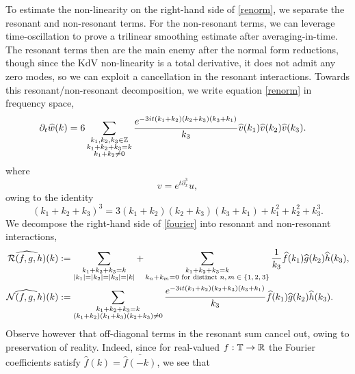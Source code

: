 To estimate the non-linearity on the right-hand side of \eqref{renorm}, we separate the resonant and non-resonant terms. For the non-resonant terms, we can leverage time-oscillation to prove a trilinear smoothing estimate after averaging-in-time. The resonant terms then are the main enemy after the normal form reductions, though since the KdV non-linearity is a total derivative, it does not admit any zero modes, so we can exploit a cancellation in the resonant interactions.  Towards this resonant/non-resonant decomposition, we write equation \eqref{renorm} in frequency space, 
\begin{align}\label{eq:fourier}
    \partial_t \widehat w(k)
        &= 6 \sum_{\substack{k_1, k_2, k_3 \in \mathbb Z\\ k_1 + k_2 + k_3 = k\\ k_1 + k_2 \neq 0}} \frac{e^{-3it(k_1 + k_2)(k_2 + k_3)(k_3 + k_1)}}{k_3}\widehat{v} (k_1) \widehat v (k_2) \widehat v (k_3).
\end{align}
where 
    \[
        v = e^{t \partial_x^3} u,
    \]
owing to the identity 
    \[
        (k_1 + k_2 + k_3)^3 = 3(k_1 + k_2)(k_2 + k_3)(k_3 + k_1) + k_1^2 + k_2^2 + k_3^3. 
    \]
We decompose the right-hand side of \eqref{fourier} into resonant and non-resonant interactions, 
    \begin{align*}
        \widehat{\mathcal R(f, g, h)} (k)
            &:= \sum_{\substack{k_1 + k_2 + k_3 = k \\|k_1| = |k_2| = |k_3| = |k|}} + \sum_{\substack{k_1 + k_2 + k_3 = k \\ k_n + k_m = 0 \text{ for distinct $n, m \in \{1,2, 3\}$}}} \frac{1}{k_3}\widehat{f} (k_1) \widehat g (k_2) \widehat h (k_3),\\
        \widehat{\mathcal N(f, g, h)} (k)
            &:= \sum_{\substack{k_1 + k_2 + k_3 = k \\ (k_1 + k_2)(k_1 + k_3) (k_2 + k_3) \neq 0}}  \frac{e^{-3it(k_1 + k_2)(k_2 + k_3)(k_3 + k_1)}}{k_3}\widehat{f} (k_1) \widehat g (k_2) \widehat h (k_3).
    \end{align*}
Observe however that off-diagonal terms in the resonant sum cancel out, owing to preservation of reality. Indeed, since for real-valued $f: \mathbb T \to \mathbb R$ the Fourier coefficients satisfy $\widehat{f}(k) = \overline{\widehat f(-k)}$, we see that 
